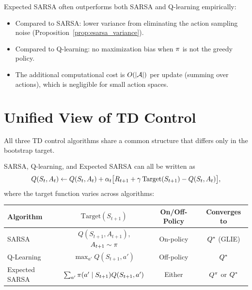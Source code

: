 \documentclass[11pt,a4paper]{article}
\begin{document}
\begin{rlconnection}[title={Expected SARSA in Practice}]
Expected SARSA often outperforms both SARSA and Q-learning
empirically:
\begin{itemize}[nosep]
  \item Compared to SARSA: lower variance from eliminating the
    action sampling noise (Proposition~\ref{prop:esarsa_variance}).
  \item Compared to Q-learning: no maximization bias when $\pi$
    is not the greedy policy.
  \item The additional computational cost is $O(|\mathcal{A}|)$ per
    update (summing over actions), which is negligible for small
    action spaces.
\end{itemize}
\end{rlconnection}

\section{Unified View of TD Control}
\label{sec:unified}

All three TD control algorithms share a common structure that
differs only in the bootstrap target.

\begin{keyresult}[title={Unified TD Control Framework}]
\begin{theorem}
\label{thm:unified}
SARSA, Q-learning, and Expected SARSA can all be written as
\begin{equation}
  Q(S_t, A_t) \leftarrow Q(S_t, A_t)
  + \alpha_t\bigl[R_{t+1} + \gamma\,\mathrm{Target}(S_{t+1})
  - Q(S_t, A_t)\bigr],
  \label{eq:unified}
\end{equation}
where the target function varies across algorithms:
\begin{center}
\begin{tabular}{lccc}
\toprule
\textbf{Algorithm} & $\mathrm{Target}(S_{t+1})$
  & \textbf{On/Off-Policy} & \textbf{Converges to} \\
\midrule
SARSA
  & $Q(S_{t+1}, A_{t+1})$, $A_{t+1} \sim \pi$
  & On-policy
  & $Q^*$ (GLIE) \\
Q-Learning
  & $\max_{a'} Q(S_{t+1}, a')$
  & Off-policy
  & $Q^*$ \\
Expected SARSA
  & $\sum_{a'} \pi(a' \mid S_{t+1}) Q(S_{t+1}, a')$
  & Either
  & $Q^{\pi}$ or $Q^*$ \\
\bottomrule
\end{tabular}
\end{center}
\end{theorem}
\end{keyresult}
\end{document}

